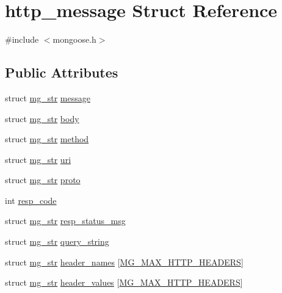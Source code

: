 \hypertarget{structhttp__message}{}\section{http\+\_\+message Struct Reference}
\label{structhttp__message}


{\ttfamily \#include $<$mongoose.\+h$>$}

\subsection*{Public Attributes}
\begin{DoxyCompactItemize}
\item 
struct \hyperlink{structmg__str}{mg\+\_\+str} \hyperlink{structhttp__message_a005f4310b3d6f7f2c818e4dff1c81d10_a005f4310b3d6f7f2c818e4dff1c81d10}{message}
\item 
struct \hyperlink{structmg__str}{mg\+\_\+str} \hyperlink{structhttp__message_ab2e0f6d6abe3879d9f85238ae9c10fd5_ab2e0f6d6abe3879d9f85238ae9c10fd5}{body}
\item 
struct \hyperlink{structmg__str}{mg\+\_\+str} \hyperlink{structhttp__message_a446deffe0f2da170fb9216fd5c8812d2_a446deffe0f2da170fb9216fd5c8812d2}{method}
\item 
struct \hyperlink{structmg__str}{mg\+\_\+str} \hyperlink{structhttp__message_a2f8d9e674965443571fd6e581393dd62_a2f8d9e674965443571fd6e581393dd62}{uri}
\item 
struct \hyperlink{structmg__str}{mg\+\_\+str} \hyperlink{structhttp__message_aafd1525884e7c83d781d86c063ec1f4f_aafd1525884e7c83d781d86c063ec1f4f}{proto}
\item 
int \hyperlink{structhttp__message_a1c4e12c873f1e4d9711d470e2e32fa65_a1c4e12c873f1e4d9711d470e2e32fa65}{resp\+\_\+code}
\item 
struct \hyperlink{structmg__str}{mg\+\_\+str} \hyperlink{structhttp__message_ae819bf6100f781e15515c01bf03f5a76_ae819bf6100f781e15515c01bf03f5a76}{resp\+\_\+status\+\_\+msg}
\item 
struct \hyperlink{structmg__str}{mg\+\_\+str} \hyperlink{structhttp__message_a899c4cefcdda3ba4fbafcfb05a85bba5_a899c4cefcdda3ba4fbafcfb05a85bba5}{query\+\_\+string}
\item 
struct \hyperlink{structmg__str}{mg\+\_\+str} \hyperlink{structhttp__message_ad0a1f9898353bfcc80ab7f2f0a22adb0_ad0a1f9898353bfcc80ab7f2f0a22adb0}{header\+\_\+names} \mbox{[}\hyperlink{mongoose_8h_a12ec0f9dfd1ce08498bb2aeed8a80d40_a12ec0f9dfd1ce08498bb2aeed8a80d40}{M\+G\+\_\+\+M\+A\+X\+\_\+\+H\+T\+T\+P\+\_\+\+H\+E\+A\+D\+E\+RS}\mbox{]}
\item 
struct \hyperlink{structmg__str}{mg\+\_\+str} \hyperlink{structhttp__message_a95a0bfefd3a05bb3db52ce50a2ef71f4_a95a0bfefd3a05bb3db52ce50a2ef71f4}{header\+\_\+values} \mbox{[}\hyperlink{mongoose_8h_a12ec0f9dfd1ce08498bb2aeed8a80d40_a12ec0f9dfd1ce08498bb2aeed8a80d40}{M\+G\+\_\+\+M\+A\+X\+\_\+\+H\+T\+T\+P\+\_\+\+H\+E\+A\+D\+E\+RS}\mbox{]}
\end{DoxyCompactItemize}


